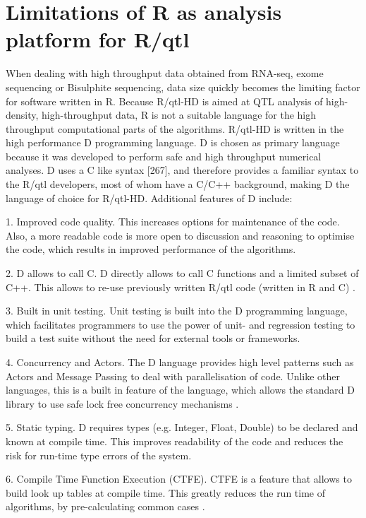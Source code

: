 \section{Limitations of R as analysis platform for R/qtl}
When dealing with high throughput data obtained from RNA-seq, exome sequencing or Bisulphite sequencing, data size quickly becomes the limiting 
factor for software written in R. Because R/qtl-HD is aimed at QTL analysis of high-density, high-throughput data, R is not a suitable language 
for the high throughput computational parts of the algorithms. R/qtl-HD is written in the high performance D programming language. D is chosen 
as primary language because it was developed to perform safe and high throughput numerical analyses. D uses a C like syntax [267], and therefore 
provides a familiar syntax to the R/qtl developers, most of whom have a C/C++ background, making D the language of choice for R/qtl-HD. 
Additional features of D include:

1. Improved code quality. This increases options for maintenance of the code. Also, a more readable code is more open to discussion and reasoning 
to optimise the code, which results in improved performance of the algorithms.

2. D allows to call C. D directly allows to call C functions and a limited subset of C++. This allows to re-use previously written R/qtl code 
(written in R and C) \cite{RQTLGuide:2009}.

3. Built in unit testing. Unit testing is built into the D programming language, which facilitates programmers to use the power of unit- and 
regression testing to build a test suite without the need for external tools or frameworks.

4. Concurrency and Actors. The D language provides high level patterns such as Actors and Message Passing to deal with parallelisation of code. 
Unlike other languages, this is a built in feature of the language, which allows the standard D library to use safe lock free concurrency mechanisms \cite{Alexandrescu:2011}.

5. Static typing. D requires types (e.g. Integer, Float, Double) to be declared and known at compile time. This improves readability of the code 
and reduces the risk for run-time type errors of the system.

6. Compile Time Function Execution (CTFE). CTFE is a feature that allows to build look up tables at compile time. This greatly reduces the run 
time of algorithms, by pre-calculating common cases \cite{ArendsBlog:2012}.

